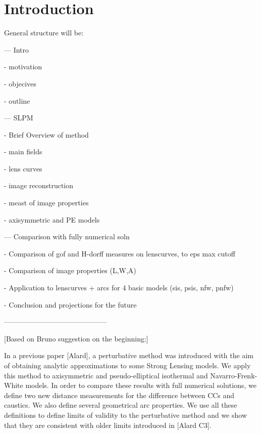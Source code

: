 \section{Introduction}

General structure will be:

--- Intro

    - motivation

    - objecives

    - outline

--- SLPM
   
   - Brief Overview of method
     
       - main fields
 
       - lens curves

       - image reconstruction

       - meast of image properties

       - axisymmetric and PE models


--- Comparison with fully numerical soln

      - Comparison of gof and H-dorff measures on lenscurves, to eps max cutoff

      - Comparison of image properties (L,W,A)
         
      - Application to lenscurves + arcs for 4 basic models (sis, psis, nfw, pnfw)



- Conclusion and projections for the future


-------------------------------------------- 

[Based on Bruno suggestion on the beginning:]


In a previous paper [Alard], a perturbative method was introduced with
the aim of obtaining analytic approximations to some Strong Lensing
models. We apply this method to axisymmetric and pseudo-elliptical
isothermal and Navarro-Frenk-White models. In order to compare these
results with full numerical solutions, we define two new distance
measurements for the difference between CCs and caustics. We also
define several geometrical arc properties. We use all these
definitions to define limits of validity to the perturbative method
and we show that they are consistent with older limits introduced in
[Alard C3].
